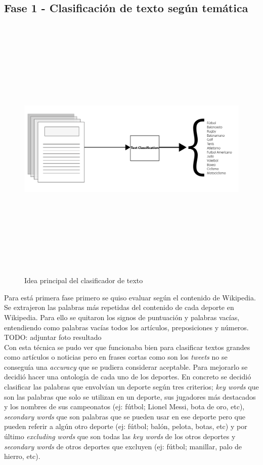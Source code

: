 \documentclass[../all.tex]{subfiles}
\begin{document}
\subsection{Fase 1 - Clasificación de texto según temática}


\begin{figure}[H]
    \centering
    \includegraphics[height=13cm, width=15cm]{imgs/textClassification.png}
    \caption{Idea principal del clasificador de texto}
\end{figure}


Para está primera fase primero se quiso evaluar según el contenido de Wikipedia. Se extrajeron las palabras más repetidas del contenido de cada deporte en Wikipedia. Para ello se quitaron los signos de puntuación y palabras vacías, entendiendo como palabras vacías todos los artículos, preposiciones y números. {\color{red} TODO: adjuntar foto resultado}\\
Con esta técnica se pudo ver que funcionaba bien para clasificar textos grandes como artículos o noticias pero en frases cortas como son los \textit{tweets} no se conseguía una \textit{accuracy} que se pudiera considerar aceptable. Para mejorarlo se decidió hacer una ontología de cada uno de los deportes. En concreto se decidió clasificar las palabras que envolvían un deporte según tres criterios; \textit{key words} que son las palabras que solo se utilizan en un deporte, sus jugadores más destacados y los nombres de sus campeonatos (ej: fútbol; Lionel Messi, bota de oro, etc), \textit{secondary words} que son palabras que se pueden usar en ese deporte pero que pueden referir a algún otro deporte (ej: fútbol; balón, pelota, botas, etc) y por último \textit{excluding words} que son todas las \textit{key words} de los otros deportes y \textit{secondary words} de otros deportes que excluyen (ej: fútbol; manillar, palo de hierro, etc).
\end{document}
